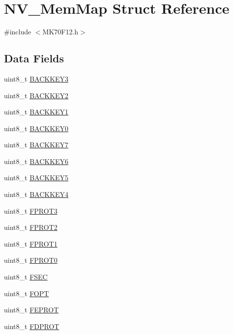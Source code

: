 \hypertarget{struct_n_v___mem_map}{}\section{N\+V\+\_\+\+Mem\+Map Struct Reference}
\label{struct_n_v___mem_map}


{\ttfamily \#include $<$M\+K70\+F12.\+h$>$}

\subsection*{Data Fields}
\begin{DoxyCompactItemize}
\item 
uint8\+\_\+t \hyperlink{struct_n_v___mem_map_a836e107cd6936ce8acd9279af7e9657e}{B\+A\+C\+K\+K\+E\+Y3}
\item 
uint8\+\_\+t \hyperlink{struct_n_v___mem_map_af746c853a18c5e8910e556b32073f938}{B\+A\+C\+K\+K\+E\+Y2}
\item 
uint8\+\_\+t \hyperlink{struct_n_v___mem_map_ab43748ac2b6d99cef1a62072d17a707b}{B\+A\+C\+K\+K\+E\+Y1}
\item 
uint8\+\_\+t \hyperlink{struct_n_v___mem_map_ad6d790fea8e791ef5cda3685fe306a08}{B\+A\+C\+K\+K\+E\+Y0}
\item 
uint8\+\_\+t \hyperlink{struct_n_v___mem_map_a398eb38f0e2b4a9da6562e42ed7a40b3}{B\+A\+C\+K\+K\+E\+Y7}
\item 
uint8\+\_\+t \hyperlink{struct_n_v___mem_map_aa2013cbf54568a1ed52cd6205b4b0b35}{B\+A\+C\+K\+K\+E\+Y6}
\item 
uint8\+\_\+t \hyperlink{struct_n_v___mem_map_a46e84393478a41f6958c4f382cad11b7}{B\+A\+C\+K\+K\+E\+Y5}
\item 
uint8\+\_\+t \hyperlink{struct_n_v___mem_map_ae4e87676d4d9881d1d60af4176b6d6f5}{B\+A\+C\+K\+K\+E\+Y4}
\item 
uint8\+\_\+t \hyperlink{struct_n_v___mem_map_a944089b14b23cff0b4f8a16e13f8b9d6}{F\+P\+R\+O\+T3}
\item 
uint8\+\_\+t \hyperlink{struct_n_v___mem_map_aace11e44cee29095fe7c0bf683039f57}{F\+P\+R\+O\+T2}
\item 
uint8\+\_\+t \hyperlink{struct_n_v___mem_map_a87204afdff32b371c03caafdf5a07b69}{F\+P\+R\+O\+T1}
\item 
uint8\+\_\+t \hyperlink{struct_n_v___mem_map_a93d4a444c27eba9b9d8939e52440e8e8}{F\+P\+R\+O\+T0}
\item 
uint8\+\_\+t \hyperlink{struct_n_v___mem_map_acb89fbc884fb10887ef063d1aa892b29}{F\+S\+E\+C}
\item 
uint8\+\_\+t \hyperlink{struct_n_v___mem_map_a3a3c0ec53723a865f6686bf4696800ba}{F\+O\+P\+T}
\item 
uint8\+\_\+t \hyperlink{struct_n_v___mem_map_a8de06ecef5c15ac5c29f613d79c9e491}{F\+E\+P\+R\+O\+T}
\item 
uint8\+\_\+t \hyperlink{struct_n_v___mem_map_a335c056263e0dae36f7a3bb82d08bce8}{F\+D\+P\+R\+O\+T}
\end{DoxyCompactItemize}


